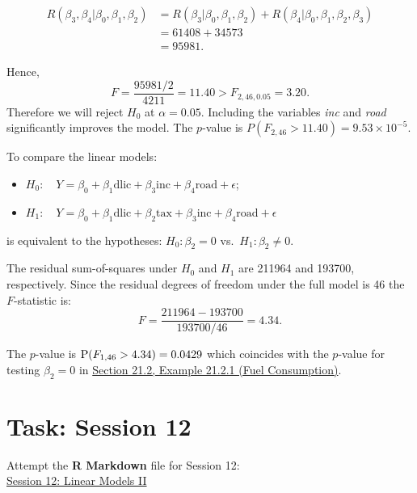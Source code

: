 \documentclass[
]{book}
\providecommand{\tightlist}{%
  \setlength{\itemsep}{0pt}\setlength{\parskip}{0pt}}
\begin{document}
\begin{align*}
R(\beta_3,\beta_4 | \beta_0,\beta_1,\beta_2) &= R(\beta_3 | \beta_0,\beta_1,\beta_2) + R (\beta_4 | \beta_0,\beta_1,\beta_2,\beta_3) \\
&= 61408 + 34573 \\
&= 95981.
\end{align*}

Hence,
\[F = \frac{95981/2}{4211} = 11.40 > F_{2,46,0.05} = 3.20.\]
Therefore we will reject \(H_0\) at \(\alpha = 0.05\). Including the variables \emph{inc} and \emph{road} significantly improves the model. The \(p\)-value is \(P(F_{2,46} > 11.40) = 9.53 \times 10^{-5}\).

To compare the linear models:

\begin{itemize}
\tightlist
\item
  \(H_0: \quad Y = \beta_0 + \beta_1 \text{dlic} + \beta_3 \text{inc} + \beta_4 \text{road} + \epsilon\);\\
\item
  \(H_1: \quad Y = \beta_0 + \beta_1 \text{dlic} + \beta_2 \text{tax} + \beta_3 \text{inc} + \beta_4 \text{road} + \epsilon\)
\end{itemize}

is equivalent to the hypotheses: \(H_0 : \beta_2 = 0\) vs.~\(H_1: \beta_2 \neq 0\).

The residual sum-of-squares under \(H_0\) and \(H_1\) are 211964 and 193700, respectively. Since the residual degrees of freedom under the full model is 46 the \(F\)-statistic is:\\

\[ F = \frac{211964 - 193700}{193700/46} = 4.34.\]

The \(p\)-value is \({\rm P} (F_{1,46} > 4.34) = 0.0429\) which coincides with the \(p\)-value for testing \(\beta_2 =0\) in \protect\hyperlink{Sec_Linear_hypo_test:single}{Section 21.2, Example 21.2.1 (Fuel Consumption)}.

\hypertarget{Sec_Linear_ANOVA:lab}{%
\section*{\texorpdfstring{{\textbf{Task: Session 12}}}{Task: Session 12}}\label{Sec_Linear_ANOVA:lab}}

Attempt the \textbf{R Markdown} file for Session 12:\\
\href{https://moodle.nottingham.ac.uk/course/view.php?id=134982\#section-2}{Session 12: Linear Models II}
\end{document}
